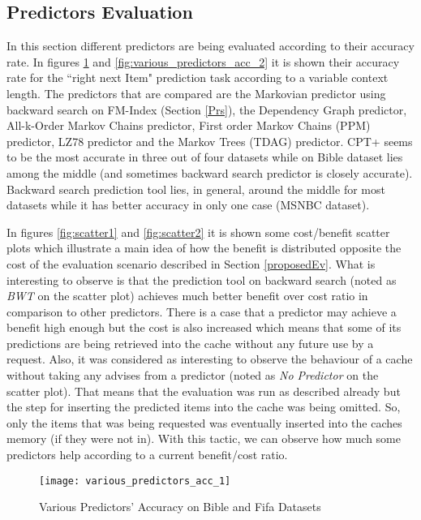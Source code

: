 \subsection{Predictors Evaluation}
In this section different predictors are being evaluated according to their accuracy rate. In figures \ref{fig:various_predictors_acc_1} and \ref{fig:various_predictors_acc_2} it is shown their accuracy rate for the ``right next Item" prediction task according to a variable context length. The predictors \cite{gueniche_git} that are compared are the Markovian predictor using backward search on FM-Index (Section \ref{Prs}), the Dependency Graph predictor, All-k-Order Markov Chains predictor, First order Markov Chains (PPM) predictor, LZ78 predictor and the Markov Trees (TDAG) predictor. CPT+ seems to be the most accurate in three out of four datasets while on Bible dataset lies among the middle (and sometimes backward search predictor is closely accurate). Backward search prediction tool lies, in general, around the middle for most datasets while it has better accuracy in only one case (MSNBC dataset).
\par In figures \ref{fig:scatter1} and \ref{fig:scatter2} it is shown some cost/benefit scatter plots which illustrate a main idea of how the benefit is distributed opposite the cost of the evaluation scenario described in Section \ref{proposedEv}. What is interesting to observe is that the prediction tool on backward search (noted as \emph{BWT} on the scatter plot) achieves much better benefit over cost ratio in comparison to other predictors. There is a case that a predictor may achieve a benefit high enough but the cost is also increased which means that some of its predictions are being retrieved into the cache without any future use by a request. Also, it was considered as interesting to observe the behaviour of a cache without taking any advises from a predictor (noted as \emph{No Predictor} on the scatter plot). That means that the evaluation was run as described already but the step for inserting the predicted items into the cache was being omitted. So, only the items that was being requested was eventually inserted into the caches memory (if they were not in). With this tactic, we can observe how much some predictors help according to a current benefit/cost ratio.


\begin{figure}[h]
    \centering
    \texttt{[image: various\_predictors\_acc\_1]}
    \caption{Various Predictors' Accuracy on Bible and Fifa Datasets}
    \label{fig:various_predictors_acc_1}
\end{figure}

